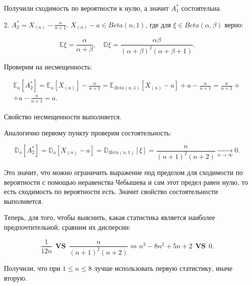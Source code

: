 \documentclass[14pt]{extarticle}
\begin{document}
Получили сходимость по вероятности к нулю, а значит $A_1^*$ состоятельна.

2. $A_2^* = X_{(n)} - \frac{n}{n+1}$. $X_{(n)} - a\in Beta(n, 1)$, где для $\xi\in Beta(\alpha, \beta)$ верно:

\begin{equation*}
    \mathbb E \xi = \frac{\alpha}{\alpha + \beta},\quad \mathbb D\xi = \frac{\alpha\beta}{(\alpha + \beta)^2(\alpha + \beta + 1)}.
\end{equation*}

Проверим на несмещенность:

\begin{gather*}
    \mathbb E_a[A_2^*] = \mathbb E_a[X_{(n)}] - \frac{n}{n+1} = \mathbb E_{Beta(n, 1)}[X_{(n)} - a] + a - \frac{n}{n+1} = \frac{n}{n+1} +\\
    + a - \frac{n}{n+1} = a.
\end{gather*}

Свойство несмещенности выполняется.

Аналогично первому пункту проверим состоятельность:

\begin{equation*}
    \mathbb D_a[A_2^*] = \mathbb D_a[X_{(n)} - a] = \mathbb D_{Beta(n, 1)}[\xi] = \frac{n}{(n+1)^2(n+2)}\underset{n\rightarrow\infty}{\longrightarrow}0.
\end{equation*}

Это значит, что можно ограничить выражение под пределом для сходимости по вероятности с помощью неравенства Чебышева и сам этот предел равен нулю, то есть сходимость по вероятности есть. Значит свойство состоятельности выполняется.

Теперь, для того, чтобы выяснить, какая статистика является наиболее предпочтительной, сравним их дисперсии:

\begin{equation*}
    \frac{1}{12n}~~ \textbf{VS}~~ \frac{n}{(n+1)^2(n+2)} \Leftrightarrow n^3 - 8n^2 + 5n + 2 ~~\textbf{VS}~~ 0.
\end{equation*}

Получили, что при $1\leqslant n \leqslant 8$ лучше использовать первую статистику, иначе вторую.
\end{document}
